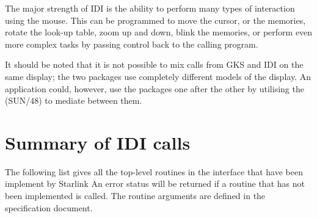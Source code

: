 The major strength of IDI is the ability to perform many types of
interaction using the mouse. This can be programmed to move the cursor,
or the memories, rotate the look-up table, zoom up and down, blink the
memories, or perform even more complex tasks by passing control back
to the calling program.

It should be noted that it is not possible to mix calls from GKS and IDI
on the same display; the two packages use completely different models
of the display. An application could, however, use the packages one after
the other by utilising the  (SUN/48) to mediate between them.


\section{Summary of IDI calls}

The following list gives all the top-level routines in the interface that
have been implement by Starlink
An error status will be returned if a routine that has not been implemented
is called. The routine arguments are defined in the specification
document.

